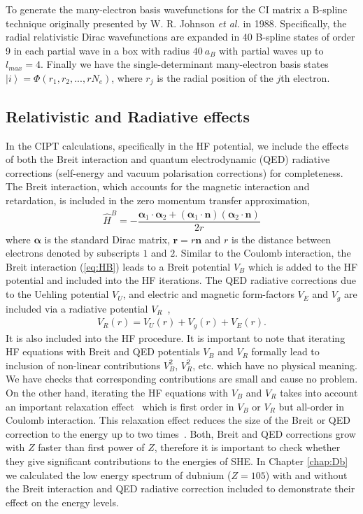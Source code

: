 \documentclass[10pt,a4paper, twoside, openright]{report}
\begin{document}
To generate the many-electron basis wavefunctions for the CI matrix a  B-spline technique originally presented by W. R. Johnson \textit{et al.	} in 1988\cite{Johnson1988}. Specifically, the radial relativistic Dirac wavefunctions are expanded in  40 B-spline states of order 9 in each partial wave in a box with radius $40 \ a_B$ with partial waves up to $l_{max}=4$. Finally we have the single-determinant many-electron basis states $\left|i\right> = \Phi\left(r_1, r_2, ... , r{N_e}\right)$, where $r_j$ is the radial position of the $j$th electron.
\subsection{Relativistic and Radiative effects}
In the CIPT calculations, specifically in the HF potential, we include the effects of both the Breit interaction \cite{Breit1929, Mann1971} and quantum electrodynamic (QED) radiative corrections (self-energy and vacuum polarisation corrections) \cite{FG2005} for completeness. The Breit interaction, which accounts for the magnetic interaction and retardation, is included in the zero momentum transfer approximation,
\begin{align}\label{eq:HB}
\hat{H}^B = -\dfrac{\boldsymbol{\alpha}_1 \cdot \boldsymbol{\alpha}_2 + \left(\boldsymbol{\alpha}_1\cdot\textbf{n}\right)\left(\boldsymbol{\alpha}_2\cdot \textbf{n}\right)}{2r}
\end{align}
where $\boldsymbol{\alpha}$ is the standard Dirac matrix, $\textbf{r}=r\textbf{n}$ and $r$ is the distance between electrons denoted by subscripts $1$ and $2$.  Similar to the Coulomb interaction, the Breit interaction (\ref{eq:HB}) leads to a Breit potential $V_B$ which is added to the HF potential and included into the HF iterations. The QED radiative corrections due to the Uehling potential $V_U$, and electric and magnetic form-factors $V_E $ and $ V_g$  are included via a radiative potential $V_R$~\cite{FG2005},
\begin{align}\label{eq:VR}
V_{R}(r) = V_{U}(r) + V_{g}(r) + V_{E}(r).
\end{align}
It is also included into the HF procedure. It is important to note that iterating HF equations with Breit and QED potentials $V_B$ and $V_R$ formally lead to inclusion of non-linear contributions  $V_B^2$, $V_R^2$, etc. which have no physical meaning. We have checks that corresponding contributions are small and cause no problem. On the other hand, iterating the HF equations with $V_B$ and $V_R$ takes into account an important relaxation effect~\cite{DF2016} which is first order in $V_B$ or $V_R$ but all-order in Coulomb interaction. This relaxation effect reduces the size of the Breit or QED correction to the energy up to two times~\cite{DF2016}. Both, Breit and QED corrections grow with $Z$ faster than first power of $Z$, therefore it is important to check whether they give significant contributions to the energies of SHE.  In Chapter \ref{chap:Db} we calculated the low energy spectrum of dubnium ($Z=105$) with and without the Breit interaction and QED radiative correction included to demonstrate their effect on the energy levels. 
\end{document}
